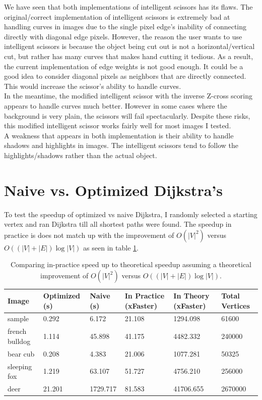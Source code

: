 \documentclass[11pt]{article}
\begin{document}
We have seen that both implementations of intelligent scissors has its flaws. The original/correct implementation of intelligent scissors is extremely bad at handling curves in images due to the single pixel edge's inability of connecting directly with diagonal edge pixels. However, the reason the user wants to use intelligent scissors is because the object being cut out is not a horizontal/vertical cut, but rather has many curves that makes hand cutting it tedious. As a result, the current implementation of edge weights is not good enough. It could be a good idea to consider diagonal pixels as neighbors that are directly connected. This would increase the scissor's ability to handle curves.\\

In the meantime, the modified intelligent scissor with the inverse Z-cross scoring appears to handle curves much better. However in some cases where the background is very plain, the scissors will fail spectacularly. Despite these risks, this modified intelligent scissor works fairly well for most images I tested.\\

A weakness that appears in both implementation is their ability to handle shadows and highlights in images. The intelligent scissors tend to follow the highlights/shadows rather than the actual object.

\section{Naive vs. Optimized Dijkstra's}

To test the speedup of optimized vs naive Dijkstra, I randomly selected a starting vertex and ran Dijkstra till all shortest paths were found. The speedup in practice is does not match up with the improvement of $O(|V|^2)$ versus $O((|V|+|E|)\log|V|)$ as seen in table \ref{table:wrong_complexity}.

\begin{table}[H]
\begin{tabular}{|l|l|l|l|l|l|}
\hline
Image & Optimized (s) & Naive (s) & In Practice (xFaster) & In Theory (xFaster) & Total Vertices \\ \hline
sample & 0.292 &  6.172 & 21.108 &  1294.098 & 61600\\ \hline
french bulldog & 1.114 &   45.898 & 41.175 &  4482.332 & 240000\\ \hline
bear cub & 0.208 &   4.383 & 21.006 & 1077.281 & 50325\\ \hline
sleeping fox & 1.219 &   63.107 & 51.727 &  4756.210 & 256000\\ \hline
deer & 21.201 &  1729.717 &  81.583 &  41706.655 & 2670000\\ \hline
\end{tabular}
\caption{\label{table:wrong_complexity} Comparing in-practice speed up to theoretical speedup assuming a theoretical improvement of $O(|V|^2)$ versus $O((|V|+|E|)\log|V|)$.}
\end{table}
\end{document}
